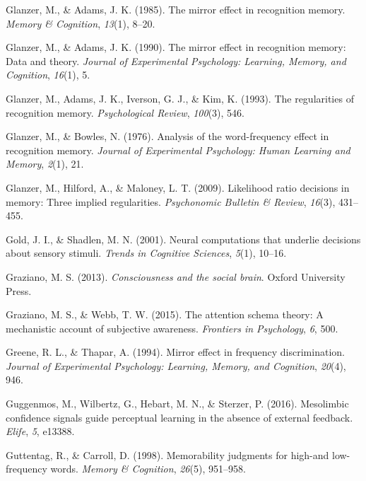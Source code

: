 \documentclass[12pt,twoside]{reedthesis}
\begin{document}
\leavevmode\hypertarget{ref-glanzer1985mirror}{}%
Glanzer, M., \& Adams, J. K. (1985). The mirror effect in recognition memory. \emph{Memory \& Cognition}, \emph{13}(1), 8--20.

\leavevmode\hypertarget{ref-glanzer1990mirror}{}%
Glanzer, M., \& Adams, J. K. (1990). The mirror effect in recognition memory: Data and theory. \emph{Journal of Experimental Psychology: Learning, Memory, and Cognition}, \emph{16}(1), 5.

\leavevmode\hypertarget{ref-glanzer1993regularities}{}%
Glanzer, M., Adams, J. K., Iverson, G. J., \& Kim, K. (1993). The regularities of recognition memory. \emph{Psychological Review}, \emph{100}(3), 546.

\leavevmode\hypertarget{ref-glanzer1976analysis}{}%
Glanzer, M., \& Bowles, N. (1976). Analysis of the word-frequency effect in recognition memory. \emph{Journal of Experimental Psychology: Human Learning and Memory}, \emph{2}(1), 21.

\leavevmode\hypertarget{ref-glanzer2009likelihood}{}%
Glanzer, M., Hilford, A., \& Maloney, L. T. (2009). Likelihood ratio decisions in memory: Three implied regularities. \emph{Psychonomic Bulletin \& Review}, \emph{16}(3), 431--455.

\leavevmode\hypertarget{ref-gold2001neural}{}%
Gold, J. I., \& Shadlen, M. N. (2001). Neural computations that underlie decisions about sensory stimuli. \emph{Trends in Cognitive Sciences}, \emph{5}(1), 10--16.

\leavevmode\hypertarget{ref-graziano2013consciousness}{}%
Graziano, M. S. (2013). \emph{Consciousness and the social brain}. Oxford University Press.

\leavevmode\hypertarget{ref-graziano2015attention}{}%
Graziano, M. S., \& Webb, T. W. (2015). The attention schema theory: A mechanistic account of subjective awareness. \emph{Frontiers in Psychology}, \emph{6}, 500.

\leavevmode\hypertarget{ref-greene1994mirror}{}%
Greene, R. L., \& Thapar, A. (1994). Mirror effect in frequency discrimination. \emph{Journal of Experimental Psychology: Learning, Memory, and Cognition}, \emph{20}(4), 946.

\leavevmode\hypertarget{ref-guggenmos2016mesolimbic}{}%
Guggenmos, M., Wilbertz, G., Hebart, M. N., \& Sterzer, P. (2016). Mesolimbic confidence signals guide perceptual learning in the absence of external feedback. \emph{Elife}, \emph{5}, e13388.

\leavevmode\hypertarget{ref-guttentag1998memorability}{}%
Guttentag, R., \& Carroll, D. (1998). Memorability judgments for high-and low-frequency words. \emph{Memory \& Cognition}, \emph{26}(5), 951--958.
\end{document}
